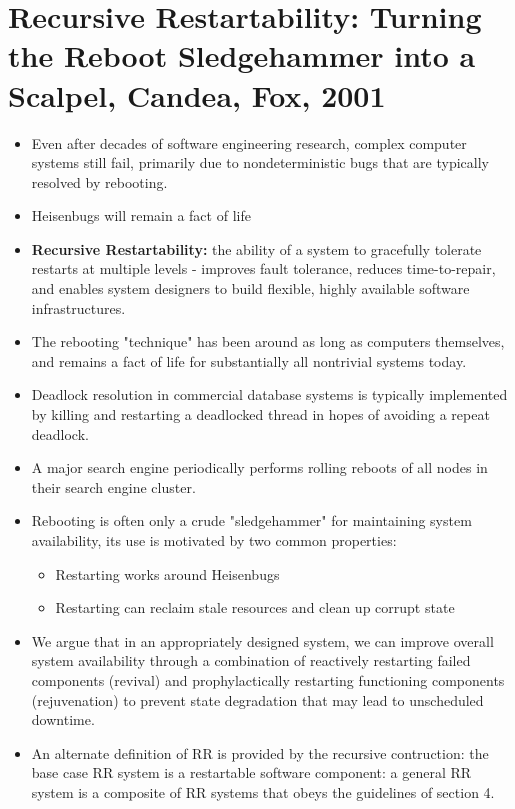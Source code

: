 \section{Recursive Restartability: Turning the Reboot Sledgehammer into a Scalpel, Candea, Fox, 2001}

\begin{itemize}
	\item Even after decades of software engineering research, complex computer systems still fail, primarily due to nondeterministic bugs that are typically resolved by rebooting.
	\item Heisenbugs will remain a fact of life
	\item \textbf{Recursive Restartability:} the ability of a system to gracefully tolerate restarts at multiple levels - improves fault tolerance, reduces time-to-repair, and enables system designers to build flexible, highly available software infrastructures. 
	\item The rebooting "technique" has been around as long as computers themselves, and remains a fact of life for substantially all nontrivial systems today.
	\item Deadlock resolution in commercial database systems is typically implemented by killing and restarting a deadlocked thread in hopes of avoiding a repeat deadlock. 
	\item A major search engine periodically performs rolling reboots of all nodes in their search engine cluster.
	\item Rebooting is often only a crude "sledgehammer" for maintaining system availability, its use is motivated by two common properties:
	\begin{itemize}
		\item Restarting works around Heisenbugs
		\item Restarting can reclaim stale resources and clean up corrupt state
	\end{itemize}
	\item We argue that in an appropriately designed system, we can improve overall system availability through a combination of reactively restarting failed components (revival) and prophylactically restarting functioning components (rejuvenation) to prevent state degradation that may lead to unscheduled downtime.
	\item An alternate definition of RR is provided by the recursive contruction: the base case RR system is a restartable software component: a general RR system is a composite of RR systems that obeys the guidelines of section 4. 

\end{itemize}
